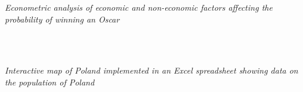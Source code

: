 \documentclass{cls/gml_cv_sets}
\begin{document}
\begin{paracol}{2}
{{\textit{\footnotesize Econometric analysis of economic and non-economic 
factors affecting the probability of winning an Oscar} \\ \vspace{-0.75em}

 \\ \vspace{0.6em}

 \\ 

\textit{\footnotesize Interactive map of Poland implemented in an Excel 
spreadsheet showing data on the population of Poland} \\ \vspace{-0.75em}

}}

\switchcolumn


\end{paracol}
\end{document}
